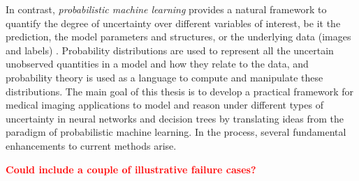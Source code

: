 In contrast, \textit{probabilistic machine learning} provides a natural framework to quantify the degree of uncertainty over different variables of interest, be it the prediction, the model parameters and structures, or the underlying data (images and labels) \cite{ghahramani2015probabilistic}. Probability distributions are used to represent all the uncertain unobserved quantities in a model and how they relate to the data, and probability theory is used as a language to compute and manipulate these distributions. The main goal of this thesis is to develop a practical framework for medical imaging applications to model and reason under different types of uncertainty in neural networks and decision trees by translating ideas from the paradigm of probabilistic machine learning. In the process, several fundamental enhancements to current methods arise. 

\textcolor{red}{\textbf{Could include a couple of illustrative failure cases? } }




%
%

